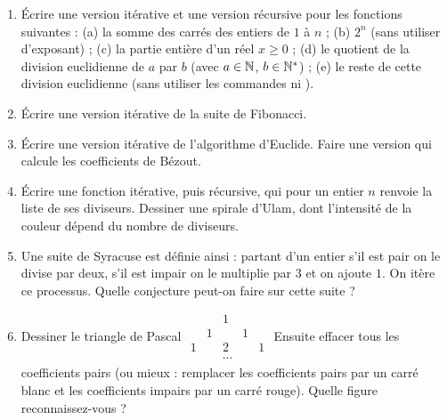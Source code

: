 \documentclass[class=report,crop=false]{standalone}
\begin{document}
\bigskip




\begin{miniexercices}
\begin{enumerate}
  \item \'Ecrire une version itérative et une version récursive pour les fonctions suivantes :
  (a) la somme des carrés des entiers de $1$ à $n$ ;
  (b) $2^n$ (sans utiliser d'exposant) ;
  (c) la partie entière d'un réel $x\ge0$ ;
  (d) le quotient de la division euclidienne de $a$ par $b$ (avec $a \in \mathbb{N}$, $b \in \mathbb{N}^*$) ;
  (e) le reste de cette division euclidienne (sans utiliser les commandes \codeinline{\%} ni \codeinline{//}).


  \item \'Ecrire une version itérative de la suite de Fibonacci.

  \item \'Ecrire une version itérative de l'algorithme d'Euclide.
  Faire une version qui calcule les coefficients de Bézout.

  \item \'Ecrire une fonction itérative, puis récursive, qui pour un entier $n$ renvoie la liste de ses diviseurs.
  Dessiner une spirale d'Ulam, dont l'intensité de la couleur dépend du nombre de diviseurs.

  \item Une suite de Syracuse est définie ainsi : partant d'un entier s'il est pair on le divise par deux,
  s'il est impair on le multiplie par $3$ et on ajoute $1$. On itère ce processus. Quelle conjecture peut-on faire
  sur cette suite ?

  \item Dessiner le triangle de Pascal
  $\begin{smallmatrix} & & 1 & & \\  & 1 & & 1 & \\ 1 & & 2 & & 1 \\ & & \cdots & & \end{smallmatrix}$
  Ensuite effacer tous les coefficients pairs (ou mieux : remplacer les coefficients pairs
  par un carré blanc et les coefficients impairs par un carré rouge). Quelle figure reconnaissez-vous ?
\end{enumerate}
\end{miniexercices}
\end{document}
